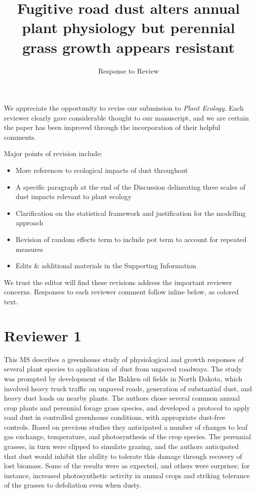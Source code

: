 \documentclass[parskip=half]{scrartcl}
\title{\Large Fugitive road dust alters annual plant physiology but perennial grass growth appears resistant}
\subtitle{Response to Review}
\author{ }
\date{}
\newcommand{\AR}[1]
	{\color{PineGreen}#1\color{black} \par }
\begin{document}
\maketitle

\vspace{-2cm} 

\AR{We appreciate the opportunity to revise our submission to \emph{Plant Ecology}. 
Each reviewer clearly gave considerable thought to our manuscript, and we are certain the paper has been improved through the incorporation of their helpful comments. 

Major points of revision include: 
\begin{itemize}
\item More references to ecological impacts of dust throughout
\item A specific paragraph at the end of the Discussion delineating three scales of dust impacts relevant to plant ecology
\item Clarification on the statistical framework and justification for the modelling approach
\item Revision of random effects term to include pot term to account for repeated measures
\item Edits \& additional materials in the Supporting Information
\end{itemize} 

We trust the editor will find these revisions address the important reviewer concerns. 
Responses to each reviewer comment follow inline below, as colored text. }

\section*{Reviewer 1}

This MS describes a greenhouse study of physiological and growth responses of several plant species to application of dust from unpaved roadways. 
The study was prompted by development of the Bakken oil fields in North Dakota, which involved heavy truck traffic on unpaved roads, generation of substantial dust, and heavy dust loads on nearby plants. 
The authors chose several common annual crop plants and perennial forage grass species, and developed a protocol to apply road dust in controlled greenhouse conditions, with appropriate dust-free controls. 
Based on previous studies they anticipated a number of changes to leaf gas exchange, temperature, and photosynthesis of the crop species. 
The perennial grasses, in turn were clipped to simulate grazing, and the authors anticipated that dust would inhibit the ability to tolerate this damage through recovery of lost biomass. 
Some of the results were as expected, and others were surprises; for instance, increased photosynthetic activity in annual crops and striking tolerance of the grasses to defoliation even when dusty.
\end{document}

